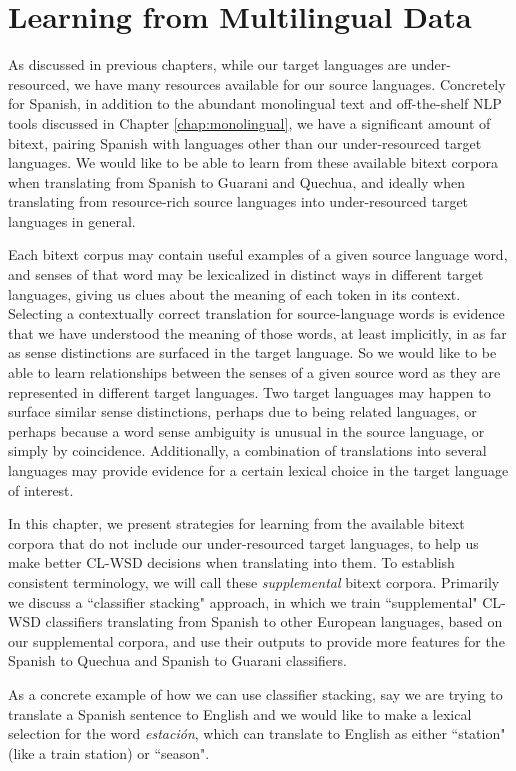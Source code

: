 \chapter{Learning from Multilingual Data}
\label{chap:multilingual}
As discussed in previous chapters, while our target languages are
under-resourced, we have many resources available for our source languages.
Concretely for Spanish, in addition to the abundant monolingual text and
off-the-shelf NLP tools discussed in Chapter \ref{chap:monolingual}, we
have a significant amount of bitext, pairing Spanish with languages other than
our under-resourced target languages. We would like to be able to learn from
these available bitext corpora when translating from Spanish to Guarani and
Quechua, and ideally when translating from resource-rich source languages into
under-resourced target languages in general.

Each bitext corpus may contain useful examples of a given source language word,
and senses of that word may be lexicalized in distinct ways in different target
languages, giving us clues about the meaning of each token in its context.
Selecting a contextually correct translation for source-language words is
evidence that we have understood the meaning of those words, at least
implicitly, in as far as sense distinctions are surfaced in the target
language. So we would like to be able to learn relationships between
the senses of a given source word as they are represented in different target
languages. Two target languages may happen to surface similar sense
distinctions, perhaps due to being related languages, or perhaps because a word
sense ambiguity is unusual in the source language, or simply by coincidence.
Additionally, a combination of translations into several languages may provide
evidence for a certain lexical choice in the target language of interest.

In this chapter, we present strategies for learning from the available bitext
corpora that do not include our under-resourced target languages, to help us
make better CL-WSD decisions when translating into them. To establish
consistent terminology, we will call these \emph{supplemental} bitext corpora.
Primarily we discuss a ``classifier stacking" approach, in which we train
``supplemental" CL-WSD classifiers translating from Spanish to other European
languages, based on our supplemental corpora, and use their outputs 
to provide more features for the Spanish to Quechua and Spanish to
Guarani classifiers.

As a concrete example of how we can use classifier stacking, say we are trying
to translate a Spanish sentence to English and we would like to make a lexical
selection for the word \emph{estación}, which can translate to English as
either ``station" (like a train station) or ``season".

